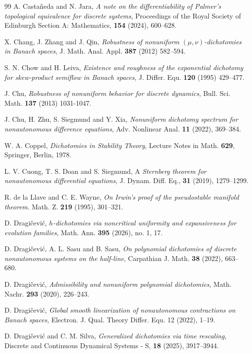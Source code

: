 \documentclass[reqno, a4paper, 10pt]{amsart}
\theoremstyle{plain}
\numberwithin{equation}{section}
\theoremstyle{remark}
\begin{document}
\begin{thebibliography}{99}
A. Casta\~{n}eda and N. Jara, \emph{A note on the differentiability of Palmer's topological equivalence for discrete systems}, Proceedings of the Royal Society of Edinburgh Section A: Mathematics, \textbf{154} (2024), 600--628.


X. Chang, J. Zhang and J. Qin, \emph{Robustness of nonuniform $(\mu,\nu)$-dichotomies in Banach spaces}, J. Math. Anal. Appl. \textbf{387} (2012) 582–594.

 S. N. Chow and H. Leiva, \emph{Existence and roughness of the exponential dichotomy for skew-product semiflow in Banach spaces},
J. Differ. Equ. \textbf{120} (1995) 429--477.


J. Chu, \emph{Robustness of nonuniform behavior for discrete dynamics}, Bull. Sci. Math.
\textbf{137} (2013) 1031-1047.

J. Chu, H. Zhu, S. Siegmund and Y. Xia, \emph{Nonuniform dichotomy spectrum for nonautonomous difference equations}, Adv. Nonlinear Anal. \textbf{11} (2022),  369--384.


 W. A. Coppel, \emph{Dichotomies in Stability Theory}, Lecture Notes in Math. \textbf{629}, Springer, Berlin, 1978.




 L. V. Cuong, T. S. Doan and S. Siegmund, A \emph{Sternberg theorem for nonautonomous differential
equations}, J. Dynam. Diff. Eq., \textbf{31} (2019), 1279--1299.

R. de la Llave and C. E. Wayne, \emph{On Irwin's proof of the pseudostable manifold theorem}. Math. Z. \textbf{219} (1995), 301--321.

D. Dragi\v cevi\' c,  \emph{$h$-dichotomies via noncritical uniformity and expansiveness for evolution families}, Math. Ann. \textbf{395} (2026), no. 1, 17.


 D. Dragi\v cevi\' c, A. L. Sasu and B. Sasu, \emph{On polynomial dichotomies of discrete nonautonomous systems on the half-line}, Carpathian J. Math. \textbf{38} (2022),  663--680.

 D. Dragi\v cevi\' c, \emph{Admissibility and nonuniform polynomial dichotomies}, Math. Nachr. \textbf{293} (2020), 226--243.

 D. Dragi\v cevi\'c, \emph{Global smooth linearization of nonautonomous contractions on Banach spaces}, Electron. J. Qual. Theory Differ. Equ. 12 (2022), 1--19.

 D. Dragi\v cevi\' c and C. M. Silva, \emph{Generalized dichotomies via time rescaling},  Discrete and Continuous Dynamical Systems - S, \textbf{18} (2025), 3917--3944.


\end{thebibliography}
\end{document}
